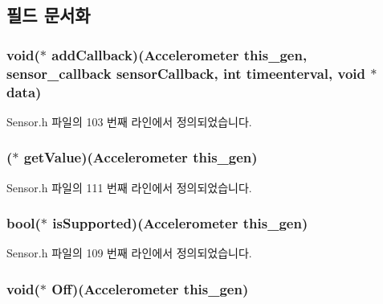 \subsection{필드 문서화}
\hypertarget{struct___accelerometer_a7965ed0fc100c12c6c00f4fb85518f35}{
\subsubsection[{add\-Callback}]{\setlength{\rightskip}{0pt plus 5cm}void($\ast$  add\-Callback)({\bf Accelerometer} this\-\_\-gen, {\bf sensor\-\_\-callback} sensor\-Callback, int timeenterval, void $\ast$data)}}\label{struct___accelerometer_a7965ed0fc100c12c6c00f4fb85518f35}


Sensor.\-h 파일의 103 번째 라인에서 정의되었습니다.

\hypertarget{struct___accelerometer_a8c75dfb5dbc8f9da5ea69ef2fb597185}{
\subsubsection[{get\-Value}]{($\ast$  get\-Value)({\bf Accelerometer} this\-\_\-gen)}}\label{struct___accelerometer_a8c75dfb5dbc8f9da5ea69ef2fb597185}


Sensor.\-h 파일의 111 번째 라인에서 정의되었습니다.

\hypertarget{struct___accelerometer_a0c01b8a5a915f39afb4429cbe3ee6d2c}{
\subsubsection[{is\-Supported}]{\setlength{\rightskip}{0pt plus 5cm}bool($\ast$  is\-Supported)({\bf Accelerometer} this\-\_\-gen)}}\label{struct___accelerometer_a0c01b8a5a915f39afb4429cbe3ee6d2c}


Sensor.\-h 파일의 109 번째 라인에서 정의되었습니다.

\hypertarget{struct___accelerometer_a6bee74ed7ad41e18037dd35d10e5ca65}{
\subsubsection[{Off}]{\setlength{\rightskip}{0pt plus 5cm}void($\ast$  Off)({\bf Accelerometer} this\-\_\-gen)}}\label{struct___accelerometer_a6bee74ed7ad41e18037dd35d10e5ca65}


